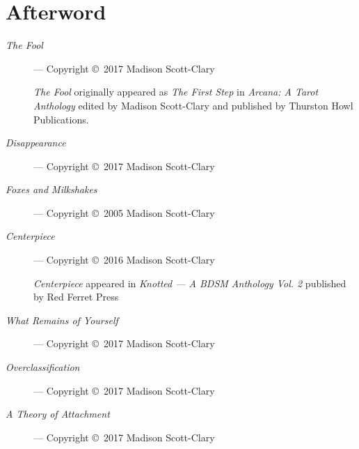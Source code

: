 \chapter*{Afterword}

\begin{description}
    \item[\emph{The Fool}]
    --- Copyright \copyright\ 2017 Madison Scott-Clary

    \emph{The Fool} originally appeared as \emph{The First Step} in \emph{Arcana: A Tarot Anthology} edited by Madison Scott-Clary and published by Thurston Howl Publications.
    \item[\emph{Disappearance}]
    --- Copyright \copyright\ 2017 Madison Scott-Clary
    \item[\emph{Foxes and Milkshakes}]
    --- Copyright \copyright\ 2005 Madison Scott-Clary
    \item[\emph{Centerpiece}]
    --- Copyright \copyright\ 2016 Madison Scott-Clary

    \emph{Centerpiece} appeared in \emph{Knotted --- A BDSM Anthology Vol. 2} published by Red Ferret Press
    \item[\emph{What Remains of Yourself}]
    --- Copyright \copyright\ 2017 Madison Scott-Clary
    \item[\emph{Overclassification}]
    --- Copyright \copyright\ 2017 Madison Scott-Clary
    \item[\emph{A Theory of Attachment}]
    --- Copyright \copyright\ 2017 Madison Scott-Clary
\end{description}
